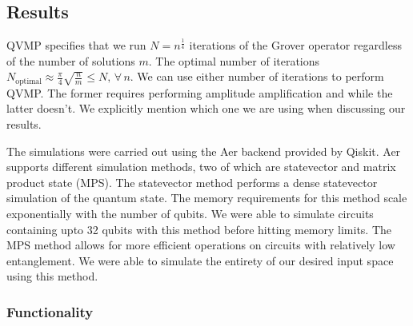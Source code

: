 \documentclass[11pt]{article}
\theoremstyle{definition}
\theoremstyle{remark}
\begin{document}
\subsection{Results} \label{sec:results}

QVMP specifies that we run $N = n^{\frac{1}{4}}$
iterations of the Grover operator regardless of the number of solutions $m$. The
optimal number of iterations $N_{\text{optimal}} \approx
\frac{\pi}{4}\sqrt{\frac{n}{m}} \leq N,\, \forall \, n$. We can use either
number of iterations to perform QVMP. The former requires performing amplitude
amplification and while the latter doesn't. We explicitly mention which one we
are using when discussing our results.

The simulations were carried out using the Aer backend provided by Qiskit. Aer
supports different simulation methods, two of which are statevector and matrix
product state (MPS). The statevector method performs a dense statevector
simulation of the quantum state. The memory requirements for this method scale
exponentially with the number of qubits. We were able to simulate circuits
containing upto 32 qubits with this method before hitting memory limits. The MPS
method allows for more efficient operations on circuits with relatively low
entanglement. We were able to simulate the entirety of our desired input space
using this method.

\subsubsection{Functionality}
\end{document}
